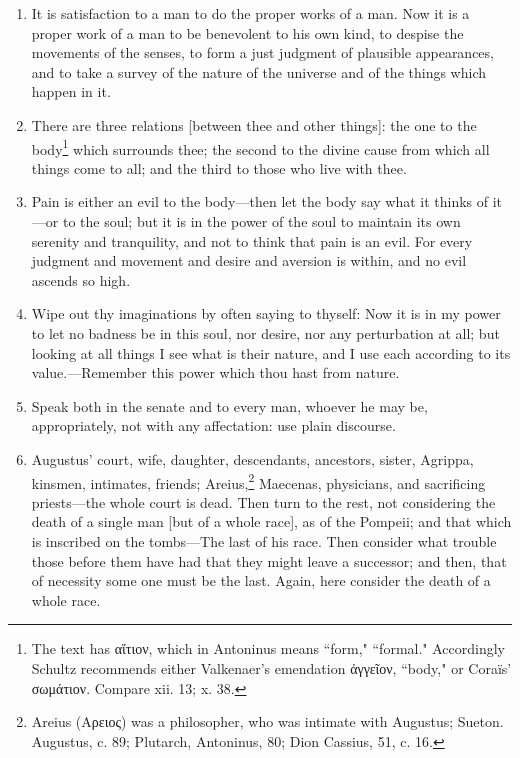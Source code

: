 \begin{enumerate}
\item It is satisfaction to a man to do the proper works of a man. Now it is a proper work of a man to be benevolent to his own kind, to despise the movements of the senses, to form a just judgment of plausible appearances, and to take a survey of the nature of the universe and of the things which happen in it.

\item There are three relations [{\clarify between thee and other things}]: the one to the body\footnote{The text has \textgreek{αἴτιον}, which in Antoninus means ``form," ``formal." Accordingly Schultz recommends either Valkenaer's emendation \textgreek{ἀγγεῖον}, ``body," or Coraïs' \textgreek{σωμάτιον}. Compare xii. 13; x. 38.} which surrounds thee; the second to the divine cause from which all things come to all; and the third to those who live with thee.

\item Pain is either an evil to the body—then let the body say what it thinks of it—or to the soul; but it is in the power of the soul to maintain its own serenity and tranquility, and not to think that pain is an evil. For every judgment and movement and desire and aversion is within, and no evil ascends so high.

\item Wipe out thy imaginations by often saying to thyself: Now it is in my power to let no badness be in this soul, nor desire, nor any perturbation at all; but looking at all things I see what is their nature, and I use each according to its value.—Remember this power which thou hast from nature.

\item Speak both in the senate and to every man, whoever he may be, appropriately, not with any affectation: use plain discourse.

\item Augustus' court, wife, daughter, descendants, ancestors, sister, Agrippa, kinsmen, intimates, friends; Areius,\footnote{Areius (\textgreek{Αρειος}) was a philosopher, who was intimate with Augustus; Sueton. Augustus, c. 89; Plutarch, Antoninus, 80; Dion Cassius, 51, c. 16.} Maecenas, physicians, and sacrificing priests—the whole court is dead. Then turn to the rest, not considering the death of a single man [{\clarify but of a whole race}], as of the Pompeii; and that which is inscribed on the tombs—The last of his race. Then consider what trouble those before them have had that they might leave a successor; and then, that of necessity some one must be the last. Again, here consider the death of a whole race.


\end{enumerate}
